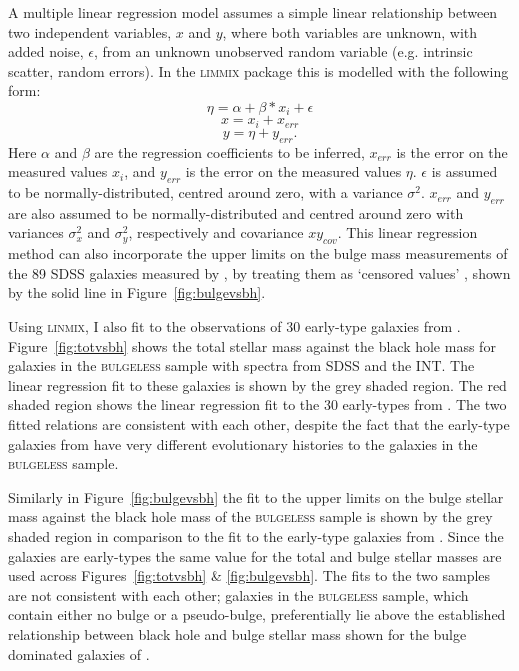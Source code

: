 {A multiple linear regression model assumes a simple linear relationship between two independent variables, $x$ and $y$, where both variables are unknown, with added noise, $\epsilon$, from an unknown unobserved random variable (e.g. intrinsic scatter, random errors). In the \textsc{limmix} package this is modelled with the following form:
\begin{equation}\label{2dlinemodel}
\eta = \alpha + \beta * x_i + \epsilon
\end{equation}
\begin{equation}\label{2dlinemodel2}
x = x_i + x_{err}
\end{equation}
\begin{equation}\label{2dlinemodel3}
y = \eta + y_{err}.
\end{equation}
Here $\alpha$ and $\beta$ are the regression coefficients to be inferred, $x_{err}$ is the error on the measured values $x_i$, and $y_{err}$ is the error on the measured values $\eta$. $\epsilon$ is assumed to be normally-distributed, centred around zero, with a variance $\sigma^2$. $x_{err}$ and $y_{err}$ are also assumed to be normally-distributed and centred around zero with variances $\sigma_x^2$ and $\sigma_y^2$, respectively and covariance $xy_{cov}$. This linear regression method can also incorporate the upper limits on the bulge mass measurements of the 89 SDSS galaxies measured by \citet[][see Section \ref{sec:galmass}]{simard11},  by treating them as `censored values' \citep[see Section 7.2 of][]{kelly07}, shown by the solid line in Figure~\ref{fig:bulgevsbh}.

Using \textsc{linmix}, I also fit to the observations of 30 early-type galaxies from \citet{haringrix04}. Figure~\ref{fig:totvsbh} shows the total stellar mass against the black hole mass for galaxies in the \textsc{bulgeless} sample with spectra from SDSS and the INT. The linear regression fit to these galaxies is shown by the grey shaded region. The red shaded region shows the linear regression fit to the 30 early-types from \citet{haringrix04}. The two fitted relations are consistent with each other, despite the fact that the early-type galaxies from \citeauthor{haringrix04} have very different evolutionary histories to the galaxies in the \textsc{bulgeless} sample.  

Similarly in Figure~\ref{fig:bulgevsbh} the fit to the upper limits on the bulge stellar mass against the black hole mass of the \textsc{bulgeless} sample is shown by the grey shaded region in comparison to the fit to the early-type galaxies from \citet{haringrix04}. Since the \citeauthor{haringrix04} galaxies are early-types the same value for the total and bulge stellar masses are used across Figures~\ref{fig:totvsbh} \& \ref{fig:bulgevsbh}. The fits to the two samples are not consistent with each other;  galaxies in the \textsc{bulgeless} sample, which contain either no bulge or a pseudo-bulge, preferentially lie above the established relationship between black hole and bulge stellar mass shown for the bulge dominated galaxies of \citet{haringrix04}. 

}
